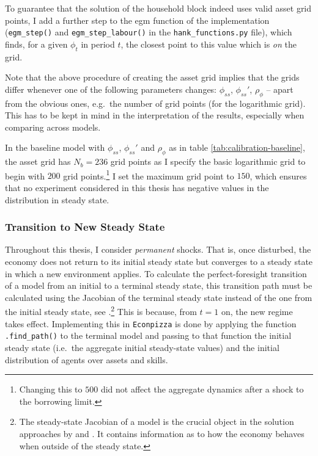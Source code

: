 \documentclass[a4paper,12pt]{article} %
\numberwithin{equation}{section} %
\numberwithin{figure}{section}
\numberwithin{table}{section}
\begin{document}
\begin{refsection}
\begin{appendices}
To guarantee that the solution of the household block indeed uses valid asset grid points, I add a further step to the \Gls{egm} function of the implementation (\texttt{egm\_step()} and \texttt{egm\_step\_labour()} in the \texttt{hank\_functions.py} file), which finds, for a given $\phi_t$ in period $t$, the closest point to this value which is \textit{on} the grid.

Note that the above procedure of creating the asset grid implies that the grids differ whenever one of the following parameters changes: $\phi_{ss}$, $\phi_{ss}'$, $\rho_{\phi}$ -- apart from the obvious ones, e.g.~the number of grid points (for the logarithmic grid). This has to be kept in mind in the interpretation of the results, especially when comparing across models. 

In the baseline model with $\phi_{ss}$, $\phi_{ss}'$ and $\rho_{\phi}$ as in table \ref{tab:calibration-baseline}, the asset grid has $N_b = 236$ grid points as I specify the basic logarithmic grid to begin with $200$ grid points.\footnote{Changing this to $500$ did not affect the aggregate dynamics after a shock to the borrowing limit.} I set the maximum grid point to $150$, which ensures that no experiment considered in this thesis has negative values in the distribution in steady state.

\subsubsection*{Transition to New Steady State}

Throughout this thesis, I consider \textit{permanent} shocks. That is, once disturbed, the economy does not return to its initial steady state but converges to a steady state in which a new environment applies. To calculate the perfect-foresight transition of a model from an initial to a terminal steady state, this transition path must be calculated using the Jacobian of the terminal steady state instead of the one from the initial steady state, see \textcite{auclert2021}.\footnote{The steady-state Jacobian of a model is the crucial object in the solution approaches by \textcite{auclert2021} and \textcite{boehl2023econpizza}. It contains information as to how the economy behaves when outside of the steady state.} This is because, from $t=1$ on, the new regime takes effect. Implementing this in \texttt{Econpizza} is done by applying the function \texttt{.find\_path()} to the terminal model and passing to that function the initial steady state (i.e.~the aggregate initial steady-state values) and the initial distribution of agents over assets and skills.


\end{appendices}
\end{refsection}
\end{document}
